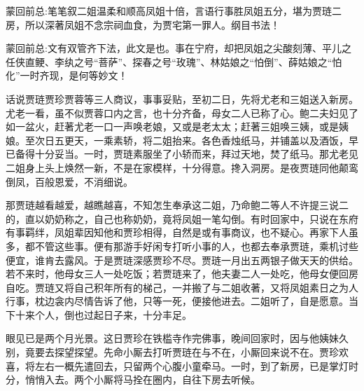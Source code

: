 

\begin{parag}
    \begin{note}蒙回前总:笔笔叙二姐温柔和顺高凤姐十倍，言语行事胜凤姐五分，堪为贾琏二房，所以深著凤姐不念宗祠血食，为贾宅第一罪人。纲目书法！\end{note}
\end{parag}


\begin{parag}
    \begin{note}蒙回前总:文有双管齐下法，此文是也。事在宁府，却把凤姐之尖酸刻薄、平儿之任侠直鲠、李纨之号“菩萨”、探春之号“玫瑰”、林姑娘之“怕倒”、薛姑娘之“怕化”一时齐现，是何等妙文！\end{note}
\end{parag}


\begin{parag}
    话说贾琏贾珍贾蓉等三人商议，事事妥贴，至初二日，先将尤老和三姐送入新房。尤老一看，虽不似贾蓉口内之言，也十分齐备，母女二人已称了心。鲍二夫妇见了如一盆火，赶著尤老一口一声唤老娘，又或是老太太；赶著三姐唤三姨，或是姨娘。至次日五更天，一乘素轿，将二姐抬来。各色香烛纸马，并铺盖以及酒饭，早已备得十分妥当。一时，贾琏素服坐了小轿而来，拜过天地，焚了纸马。那尤老见二姐身上头上焕然一新，不是在家模样，十分得意。搀入洞房。是夜贾琏同他颠鸾倒凤，百般恩爱，不消细说。
\end{parag}


\begin{parag}
    那贾琏越看越爱，越瞧越喜，不知怎生奉承这二姐，乃命鲍二等人不许提三说二的，直以奶奶称之，自己也称奶奶，竟将凤姐一笔勾倒。有时回家中，只说在东府有事羁绊，凤姐辈因知他和贾珍相得，自然是或有事商议，也不疑心。再家下人虽多，都不管这些事。便有那游手好闲专打听小事的人，也都去奉承贾琏，乘机讨些便宜，谁肯去露风。于是贾琏深感贾珍不尽。贾琏一月出五两银子做天天的供给。若不来时，他母女三人一处吃饭；若贾琏来了，他夫妻二人一处吃，他母女便回房自吃。贾琏又将自己积年所有的梯己，一并搬了与二姐收著，又将凤姐素日之为人行事，枕边衾内尽情告诉了他，只等一死，便接他进去。二姐听了，自是愿意。当下十来个人，倒也过起日子来，十分丰足。
\end{parag}


\begin{parag}
    眼见已是两个月光景。这日贾珍在铁槛寺作完佛事，晚间回家时，因与他姨妹久别，竟要去探望探望。先命小厮去打听贾琏在与不在，小厮回来说不在。贾珍欢喜，将左右一概先遣回去，只留两个心腹小童牵马。一时，到了新房，已是掌灯时分，悄悄入去。两个小厮将马拴在圈内，自往下房去听候。
\end{parag}


